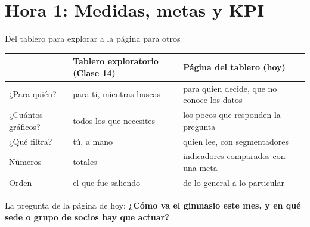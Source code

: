 \documentclass[aspectratio=169,11pt]{beamer}
\begin{document}
\section{Hora 1: Medidas, metas y KPI}
\begin{frame}[t]{Del tablero para explorar a la página para otros}
  \footnotesize
  \renewcommand{\arraystretch}{1.2}
  \begin{tabular}{@{}L{2.9cm}L{4.9cm}L{5.2cm}@{}}
    \toprule
    & \textbf{Tablero exploratorio (Clase 14)} & \textbf{Página del tablero (hoy)} \\
    \midrule
    ¿Para quién? & para ti, mientras buscas & para quien decide, que no conoce los datos \\
    ¿Cuántos gráficos? & todos los que necesites & los pocos que responden la pregunta \\
    ¿Qué filtra? & tú, a mano & quien lee, con segmentadores \\
    Números & totales & indicadores comparados con una meta \\
    Orden & el que fue saliendo & de lo general a lo particular \\
    \bottomrule
  \end{tabular}

  \vspace{0.25cm}
  \small La pregunta de la página de hoy: \textbf{¿Cómo va el gimnasio
  este mes, y en qué sede o grupo de socios hay que actuar?}
\end{frame}
\end{document}
